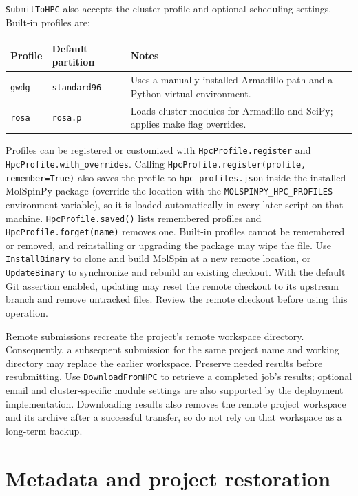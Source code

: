 \documentclass[11pt,a4paper]{article}
\begin{document}
\texttt{SubmitToHPC} also accepts the cluster profile and optional scheduling
settings. Built-in profiles are:
\begin{center}
\begin{tabularx}{\linewidth}{l l X}
\toprule
Profile & Default partition & Notes \\
\midrule
\texttt{gwdg} & \texttt{standard96} & Uses a manually installed Armadillo
path and a Python virtual environment. \\
\texttt{rosa} & \texttt{rosa.p} & Loads cluster modules for Armadillo and
SciPy; applies make flag overrides. \\
\bottomrule
\end{tabularx}
\end{center}

Profiles can be registered or customized with
\texttt{HpcProfile.register} and \texttt{HpcProfile.with\_overrides}.
Calling \texttt{HpcProfile.register(profile, remember=True)} also saves the
profile to \texttt{hpc\_profiles.json} inside the installed MolSpinPy package
(override the location with the \texttt{MOLSPINPY\_HPC\_PROFILES} environment
variable), so it is loaded automatically in every later script on that
machine. \texttt{HpcProfile.saved()} lists remembered profiles and
\texttt{HpcProfile.forget(name)} removes one. Built-in profiles cannot be
remembered or removed, and reinstalling or upgrading the package may wipe the
file. Use
\texttt{InstallBinary} to clone and build MolSpin at a new remote location,
or \texttt{UpdateBinary} to synchronize and rebuild an existing checkout.
With the default Git assertion enabled, updating may reset the remote checkout
to its upstream branch and remove untracked files. Review the remote checkout
before using this operation.

Remote submissions recreate the project's remote workspace directory.
Consequently, a subsequent submission for the same project name and working
directory may replace the earlier workspace. Preserve needed results before
resubmitting. Use \texttt{DownloadFromHPC} to retrieve a completed job's
results; optional email and cluster-specific module settings are also
supported by the deployment implementation. Downloading results also
removes the remote project workspace and its archive after a successful
transfer, so do not rely on that workspace as a long-term backup.

\section{Metadata and project restoration}
\end{document}
